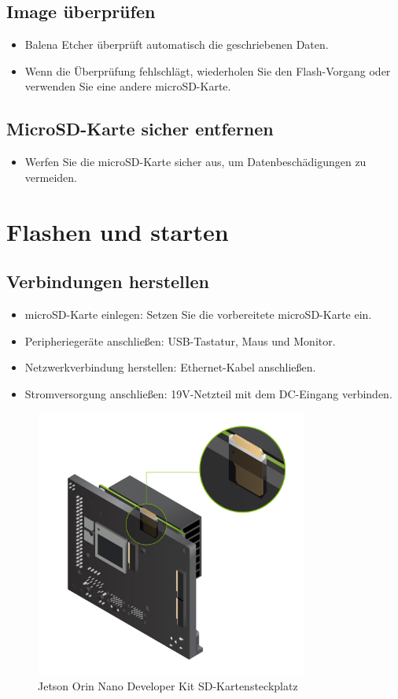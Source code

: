 \documentclass[12pt,a4paper]{report}
\begin{document}
\subsection{Image überprüfen}
\begin{itemize}
    \item Balena Etcher überprüft automatisch die geschriebenen Daten.
    \item Wenn die Überprüfung fehlschlägt, wiederholen Sie den Flash-Vorgang oder verwenden Sie eine andere microSD-Karte.
\end{itemize}

\subsection{MicroSD-Karte sicher entfernen}
\begin{itemize}
    \item Werfen Sie die microSD-Karte sicher aus, um Datenbeschädigungen zu vermeiden.
\end{itemize}
\clearpage

\section{Flashen und starten}
\subsection{Verbindungen herstellen}
\begin{itemize}
    \item microSD-Karte einlegen: Setzen Sie die vorbereitete microSD-Karte ein.
    \item Peripheriegeräte anschließen: USB-Tastatur, Maus und Monitor.
    \item Netzwerkverbindung herstellen: Ethernet-Kabel anschließen.
    \item Stromversorgung anschließen: 19V-Netzteil mit dem DC-Eingang verbinden.
\end{itemize}
\begin{figure}[h!]
    \centering
    \includegraphics[width=0.8\textwidth ]{Bilder/jetson-orin-nano-dev-kit-sd-slot.jpg}
    \caption{Jetson Orin Nano Developer Kit SD-Kartensteckplatz}
\end{figure}
\clearpage
\end{document}
